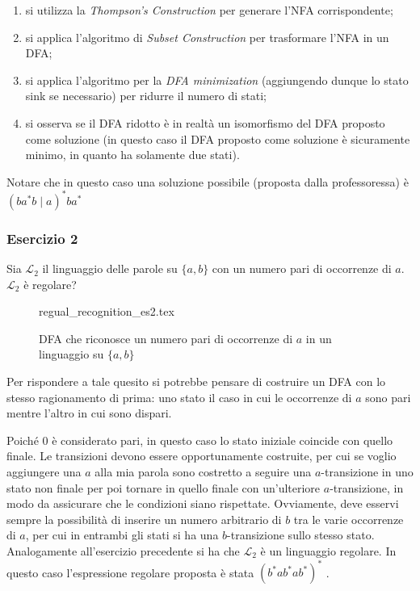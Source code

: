 \documentclass[class=book, crop=false, oneside, 12pt]{standalone}
\begin{document}
\begin{enumerate}
    \item si utilizza la \emph{Thompson's Construction} per generare l'NFA corrispondente;
    \item si applica l'algoritmo di \emph{Subset Construction} per trasformare l'NFA in un DFA;
    \item si applica l'algoritmo per la \emph{DFA minimization} (aggiungendo dunque lo stato sink se necessario) per ridurre il numero di stati;
    \item si osserva se il DFA ridotto è in realtà un isomorfismo del DFA proposto come soluzione (in questo caso il DFA proposto come soluzione è sicuramente minimo, in quanto ha solamente due stati).
\end{enumerate}

\noindent Notare che in questo caso una soluzione possibile (proposta dalla professoressa) è \((b a^*b \mid a)^* ba^*\)

\subsubsection{Esercizio 2}
Sia \(\mathcal{L}_2\) il linguaggio delle parole su \(\{a, b\}\) con un numero pari di occorrenze di \(a\). \(\mathcal{L}_2\) è regolare?
\begin{figure}[H]
    \centering
    {regual_recognition_es2.tex}
    \caption{DFA che riconosce un numero pari di occorrenze di \(a\) in un linguaggio su \(\{a,b\}\)}
    \label{a_pari}
\end{figure}

Per rispondere a tale quesito si potrebbe pensare di costruire un DFA con lo stesso ragionamento di prima: uno stato il caso in cui le occorrenze di \(a\) sono pari mentre l'altro in cui sono dispari.

Poiché \(0\) è considerato pari, in questo caso lo stato iniziale coincide con quello finale. Le transizioni devono essere opportunamente costruite, per cui se voglio aggiungere una \(a\) alla mia parola sono costretto a seguire una \(a\)-transizione in uno stato non finale per poi tornare in quello finale con un'ulteriore \(a\)-transizione, in modo da assicurare che le condizioni siano rispettate. Ovviamente, deve esservi sempre la possibilità di inserire un numero arbitrario di \(b\) tra le varie occorrenze di \(a\), per cui in entrambi gli stati si ha una \(b\)-transizione sullo stesso stato. Analogamente all'esercizio precedente si ha che \(\mathcal{L}_2\) è un linguaggio regolare. In questo caso l'espressione regolare proposta è stata \((b^*ab^*ab^*)^*\) .
\end{document}
